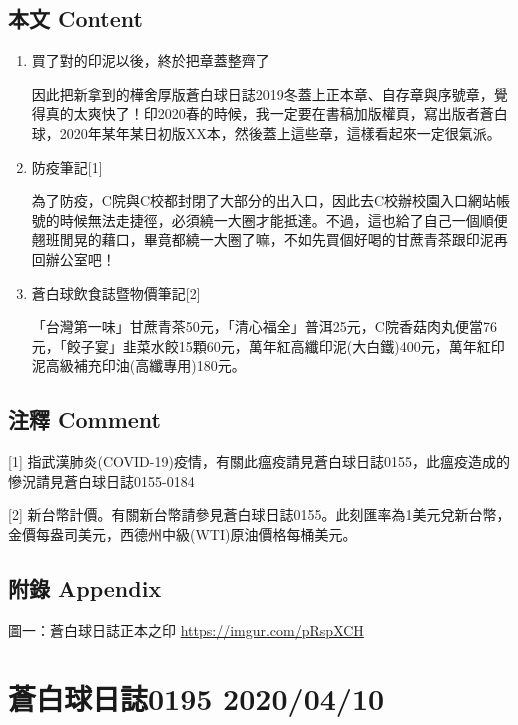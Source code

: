 \documentclass[
]{article}
\begin{document}
\hypertarget{ux672cux6587-content-8}{%
\subsection{本文 Content}\label{ux672cux6587-content-8}}

\begin{enumerate}
\def\labelenumi{\arabic{enumi}.}
\item
  買了對的印泥以後，終於把章蓋整齊了

  因此把新拿到的樺舍厚版蒼白球日誌2019冬蓋上正本章、自存章與序號章，覺得真的太爽快了！印2020春的時候，我一定要在書稿加版權頁，寫出版者蒼白球，2020年某年某日初版XX本，然後蓋上這些章，這樣看起來一定很氣派。
\item
  防疫筆記{[}1{]}

  為了防疫，C院與C校都封閉了大部分的出入口，因此去C校辦校園入口網站帳號的時候無法走捷徑，必須繞一大圈才能抵達。不過，這也給了自己一個順便翹班閒晃的藉口，畢竟都繞一大圈了嘛，不如先買個好喝的甘蔗青茶跟印泥再回辦公室吧！
\item
  蒼白球飲食誌暨物價筆記{[}2{]}

  「台灣第一味」甘蔗青茶50元，「清心福全」普洱25元，C院香菇肉丸便當76元，「餃子宴」韭菜水餃15顆60元，萬年紅高纖印泥(大白鐵)400元，萬年紅印泥高級補充印油(高纖專用)180元。
\end{enumerate}

\hypertarget{ux6ce8ux91cb-comment-8}{%
\subsection{注釋 Comment}\label{ux6ce8ux91cb-comment-8}}

{[}1{]}
指武漢肺炎(COVID-19)疫情，有關此瘟疫請見蒼白球日誌0155，此瘟疫造成的慘況請見蒼白球日誌0155-0184

{[}2{]}
新台幣計價。有關新台幣請參見蒼白球日誌0155。此刻匯率為1美元兌新台幣，金價每盎司美元，西德州中級(WTI)原油價格每桶美元。

\hypertarget{ux9644ux9304-appendix-8}{%
\subsection{附錄 Appendix}\label{ux9644ux9304-appendix-8}}

圖一：蒼白球日誌正本之印 \url{https://imgur.com/pRspXCH}

\hypertarget{ux84bcux767dux7403ux65e5ux8a8c0195-20200410}{%
\section{蒼白球日誌0195
2020/04/10}\label{ux84bcux767dux7403ux65e5ux8a8c0195-20200410}}
\end{document}
